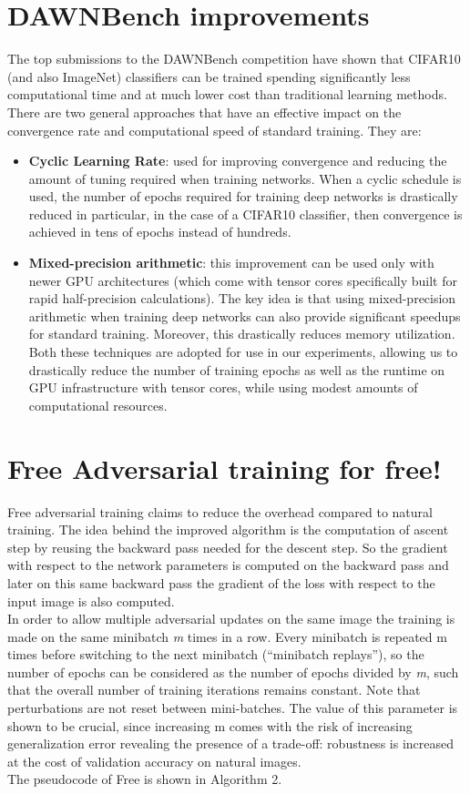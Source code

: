 \documentclass{article}
\begin{document}
\section{DAWNBench improvements}
The top submissions to the DAWNBench competition have shown that CIFAR10 (and
also ImageNet) classifiers can be trained spending significantly less
computational time and at much lower cost than traditional learning methods.
There are two general approaches that have an effective impact on the
convergence rate and computational speed of standard training. They are:
\begin{itemize}

\item \textbf{Cyclic Learning Rate}: used for improving convergence and reducing
the amount of tuning required when training networks. When a cyclic schedule is
used, the number of epochs required for training deep networks is drastically
reduced in particular, in the case of a CIFAR10 classifier, then convergence is
achieved in tens of epochs instead of hundreds.
\item \textbf{Mixed-precision arithmetic}: this improvement can be used only
with newer GPU architectures (which come with tensor cores specifically built
for rapid half-precision calculations). The key idea is that using
mixed-precision arithmetic when training deep networks can also provide
significant speedups for standard training. Moreover, this drastically reduces
memory utilization. Both these techniques are adopted for use in our
experiments, allowing us to drastically reduce the number of training epochs as
well as the runtime on GPU  infrastructure with tensor cores, while using modest
amounts of computational resources. 
\end{itemize}
\section{Free Adversarial training for free!}

Free adversarial training \cite{ShafahiEtAl2019b} claims to reduce the overhead
compared to natural training. The idea behind the improved algorithm is the
computation of ascent step by reusing the backward pass needed for the descent
step. So the gradient with respect to the network parameters is computed on the
backward pass and later on this same backward pass the gradient of the loss with
respect to the input image is also computed.\\
In order to allow multiple adversarial updates on the same image the training is
made on the same minibatch \textit{m} times in a row. Every minibatch is
repeated m times before switching to the next minibatch (“minibatch replays”),
so the number of epochs can be considered as the number of epochs divided by \textit{m},
such that the overall number of training iterations remains constant. Note that
perturbations are not reset between mini-batches. The value of this parameter is
shown to be crucial, since increasing m comes with the risk of increasing
generalization error revealing  the presence of a trade-off: robustness is
increased at the cost of validation accuracy on natural images.\\
The pseudocode of Free is shown in Algorithm 2.
\end{document}
